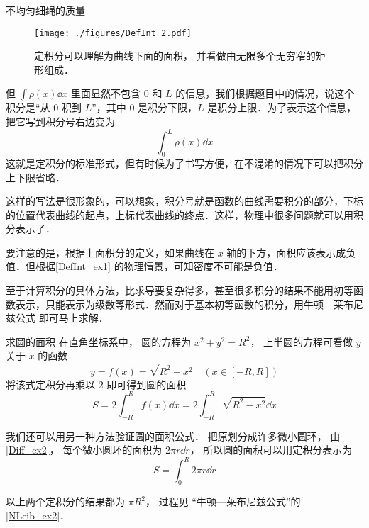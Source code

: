 \begin{example}{不均匀细绳的质量}
\begin{figure}[ht]
\centering
\texttt{[image: ./figures/DefInt\_2.pdf]}
\caption{定积分可以理解为曲线下面的面积， 并看做由无限多个无穷窄的矩形组成．} \label{DefInt_fig1} %
\end{figure}

但 $\int \rho(x) \dd{x}$ 里面显然不包含 $0$ 和 $L$ 的信息，我们根据题目中的情况，说这个积分是“从 $0$ 积到 $L$”，其中 $0$ 是积分下限，$L$ 是积分上限．为了表示这个信息，把它写到积分号右边变为
\begin{equation}
\int_0^L \rho(x) \dd{x}
\end{equation}
这就是定积分的标准形式，但有时候为了书写方便，在不混淆的情况下可以把积分上下限省略．
\end{example}

这样的写法是很形象的，可以想象，积分号就是函数的曲线需要积分的部分，下标的位置代表曲线的起点，上标代表曲线的终点．这样，物理中很多问题就可以用积分表示了．

要注意的是，根据上面积分的定义，如果曲线在 $x$ 轴的下方，面积应该表示成负值．但根据\autoref{DefInt_ex1} 的物理情景，可知密度不可能是负值．

至于计算积分的具体方法，比求导要复杂得多，甚至很多积分的结果不能用初等函数表示，只能表示为级数等形式．然而对于基本初等函数的积分，用牛顿－莱布尼兹公式 即可马上求解．

\begin{example}{求圆的面积}\label{DefInt_ex2}
在直角坐标系中， 圆的方程为 $x^2 + y^2 = R^2$， 上半圆的方程可看做 $y$ 关于 $x$ 的函数
\begin{equation}
y = f(x) = \sqrt{R^2 - x^2} \quad (x\in [-R,R])
\end{equation}
将该式定积分再乘以 2 即可得到圆的面积
\begin{equation}
S = 2\int_{-R}^{R} f(x) \dd{x} = 2\int_{-R}^{R} \sqrt{R^2 - x^2} \dd{x}
\end{equation}

我们还可以用另一种方法验证圆的面积公式． 把原划分成许多微小圆环， 由\autoref{Diff_ex2}， 每个微小圆环的面积为 $2\pi r\dd{r}$， 所以圆的面积可以用定积分表示为
\begin{equation}
S = \int_0^{R} 2\pi r\dd{r}
\end{equation}

以上两个定积分的结果都为 $\pi R^2$， 过程见 “牛顿—莱布尼兹公式”的\autoref{NLeib_ex2}．
\end{example}

